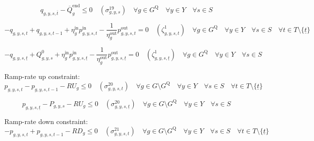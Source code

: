 \documentclass{article}
\newcommand{\sGenerators}{G}
\newcommand{\sStorage}{G^{\mathrm{Q}}}
\newcommand{\sYears}{Y}
\newcommand{\sScenarios}{S}
\newcommand{\sIntervals}{T}
\newcommand{\iGenerator}{g}
\newcommand{\iYear}{y}
\newcommand{\iScenario}{s}
\newcommand{\iInterval}{t}
\newcommand{\iIntervalTerminal}{\overline{\iInterval}}
\newcommand{\iIntervalStart}{\underline{\iInterval}}
\newcommand{\cRampRateUp}[1][\iGenerator]{RU_{#1}}
\newcommand{\cRampRateDown}[1][\iGenerator]{RD_{#1}}
\newcommand{\cStorageUnitEnergyIntervalEndMax}[1][\iGenerator]{\overline{Q}^{\mathrm{end}}_{#1}}
\newcommand{\cStorageUnitEfficiencyCharging}{\eta_{\iGenerator}^{\mathrm{in}}}
\newcommand{\cStorageUnitEfficiencyDischarging}{\eta_{\iGenerator}^{\mathrm{out}}}
\newcommand{\cPowerInitial}[1][\iGenerator,\iYear,\iScenario]{\hat{P}_{#1}}
\newcommand{\cStorageEnergyInitial}[1][\iGenerator,\iYear,\iScenario]{Q_{#1}^{0}}
\newcommand{\vPower}[1][\iGenerator,\iYear,\iScenario,\iInterval]{p_{#1}}
\newcommand{\vPowerIn}[1][\iGenerator,\iYear,\iScenario,\iInterval]{p^{\mathrm{in}}_{#1}}
\newcommand{\vPowerOut}[1][\iGenerator,\iYear,\iScenario,\iInterval]{p^{\mathrm{out}}_{#1}}
\newcommand{\vStorageUnitEnergy}[1][\iGenerator,\iYear,\iScenario,\iInterval]{q_{#1}}
\newcommand{\dMaxStorageEnergyIntervalEnd}[1][\iGenerator,\iYear,\iScenario]{\sigma_{#1}^{19}}
\newcommand{\dRampRateUp}[1][\iGenerator,\iYear,\iScenario,\iInterval]{\sigma_{#1}^{20}}
\newcommand{\dRampRateDown}[1][\iGenerator,\iYear,\iScenario,\iInterval]{\sigma_{#1}^{21}}
\newcommand{\dStorageEnergyTransition}[1][\iGenerator,\iYear,\iScenario,\iInterval]{\zeta_{#1}^{1}}
\newcommand{\sScenarioSets}{\quad \forall \iYear \in \sYears \quad \forall \iScenario \in \sScenarios \quad \forall \iInterval \in \sIntervals}
\begin{document}
\begin{equation}
	\vStorageUnitEnergy[\iGenerator,\iYear,\iScenario,\iIntervalTerminal] - \cStorageUnitEnergyIntervalEndMax \leq  0 \quad (\dMaxStorageEnergyIntervalEnd) \quad \forall \iGenerator \in \sStorage \quad \forall \iYear \in \sYears \quad \forall \iScenario \in \sScenarios
\end{equation}

\begin{equation}
	- \vStorageUnitEnergy + \vStorageUnitEnergy[\iGenerator,\iYear,\iScenario,\iInterval-1] + \cStorageUnitEfficiencyCharging \vPowerIn - \frac{1}{\cStorageUnitEfficiencyDischarging} \vPowerOut = 0 \quad (\dStorageEnergyTransition) \quad \forall \iGenerator \in \sStorage \sScenarioSets \setminus \{\iIntervalStart\}
\end{equation}

\begin{equation}
	- \vStorageUnitEnergy[\iGenerator,\iYear,\iScenario,\iIntervalStart] + \cStorageEnergyInitial + \cStorageUnitEfficiencyCharging \vPowerIn[\iGenerator,\iYear,\iScenario,\iIntervalStart] - \frac{1}{\cStorageUnitEfficiencyDischarging} \vPowerOut[\iGenerator,\iYear,\iScenario,\iIntervalStart] = 0 \quad (\dStorageEnergyTransition[\iGenerator,\iYear,\iScenario,\iIntervalStart]) \quad \forall \iGenerator \in \sStorage \quad \forall \iYear \in \sYears \quad \forall \iScenario \in \sScenarios
\end{equation}

Ramp-rate up constraint:
\begin{equation}
	\vPower - \vPower[\iGenerator,\iYear,\iScenario,\iInterval-1] - \cRampRateUp \leq 0 \quad (\dRampRateUp) \quad \forall \iGenerator \in \sGenerators \setminus \sStorage \quad \forall \iYear \in \sYears \quad \forall \iScenario \in \sScenarios \quad \forall \iInterval \in \sIntervals \setminus \{\iIntervalStart\}
\end{equation}

\begin{equation}
	\vPower[\iGenerator,\iYear,\iScenario,\iIntervalStart] - \cPowerInitial - \cRampRateUp \leq 0 \quad (\dRampRateUp[\iGenerator,\iYear,\iScenario,\iIntervalStart]) \quad \forall \iGenerator \in \sGenerators \setminus \sStorage \quad \forall \iYear \in \sYears \quad \forall \iScenario \in \sScenarios
\end{equation}

Ramp-rate down constraint:
\begin{equation}
	- \vPower + \vPower[\iGenerator,\iYear,\iScenario,\iInterval-1] - \cRampRateDown \leq 0 \quad (\dRampRateDown) \quad \forall \iGenerator \in \sGenerators \setminus \sStorage \quad \forall \iYear \in \sYears \quad \forall \iScenario \in \sScenarios \quad \forall \iInterval \in \sIntervals \setminus \{\iIntervalStart\}
\end{equation}
\end{document}
